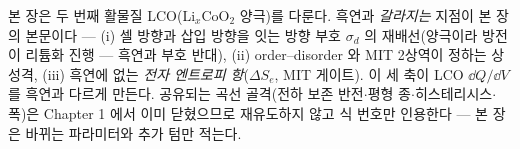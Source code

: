 본 장은 두 번째 활물질 LCO(Li$_x$CoO$_2$ 양극)를 다룬다. 흑연과 \emph{갈라지는} 지점이 본 장의 본문이다
--- (i) 셀 방향과 삽입 방향을 잇는 방향 부호 $\sigma_d$ 의 재배선(양극이라 방전이 리튬화 진행 --- 흑연과
부호 반대), (ii) order--disorder 와 MIT 2상역이 정하는 상성격, (iii) 흑연에 없는 \emph{전자 엔트로피
항}($\Delta S_e$, MIT 게이트). 이 세 축이 LCO $\dd Q/\dd V$ 를 흑연과 다르게 만든다. 공유되는 곡선
골격(전하 보존 반전$\cdot$평형 종$\cdot$히스테리시스$\cdot$폭)은 Chapter 1 에서 이미 닫혔으므로 재유도하지
않고 식 번호만 인용한다 --- 본 장은 바뀌는 파라미터와 추가 텀만 적는다.

\tableofcontents
\clearpage
